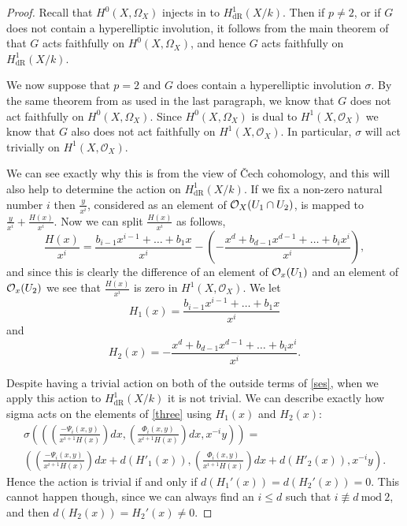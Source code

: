 \documentclass[draft, 11pt]{article} %
\theoremstyle{plain}
\theoremstyle{remark}
\newcommand{\cO}{{\cal O}}
\newcommand{\cech}{\v{C}ech }
\newcommand{\hzero}{{H^0(X,\Omega_X)}}
\newcommand{\hone}{H^1(X,\mathcal{O}_X)}
\newcommand{\derhamhone}{H_{\text {dR}}^1(X/k)}
\begin{document}
\begin{proof}
Recall that $H^0(X,\Omega_X)$ injects in to $\derhamhone$.
Then if $p \neq 2$, or if $G$ does not contain a hyperelliptic involution, it follows from the main theorem of \cite{faithfulaction} that $G$ acts faithfully on $H^0(X,\Omega_X)$, and hence $G$ acts faithfully on $\derhamhone$.

We now suppose that $p=2$ and $G$ does contain a hyperelliptic involution $\sigma$.
By the same theorem from \cite{faithfulaction} as used in the last paragraph, we know that $G$ does not act faithfully on $\hzero$.
Since $\hzero$ is dual to $\hone$ we know that $G$ also does not act faithfully on $\hone$.
In particular, $\sigma$ will act trivially on $\hone$.

We can see exactly why this is from the view of \cech cohomology, and this will also help to determine the action on $\derhamhone$.
If we fix a non-zero natural number $i$ then $\frac{y}{x^i}$, considered as an element of $\cO_X(U_1\cap U_2)$, is mapped to $\frac{y}{x^i} + \frac{H(x)}{x^i}$. 
Now we can split $\frac{H(x)}{x^i}$ as follows, 
\begin{equation*}
\frac{H(x)}{x^i} =  \frac{b_{i-1}x^{i-1} + \ldots + b_1x}{x^i} - \left( - \frac{x^d + b_{d-1}x^{d-1} + \ldots + b_ix^i}{x^i} \right),
\end{equation*}
and since this is clearly the difference of an element of $\cO_x(U_1)$ and an element of $\cO_x(U_2)$ we see that $\frac{H(x)}{x^i}$ is zero in $\hone$.
We let 
\[
H_1(x) = \frac{b_{i-1}x^{i-1} + \ldots + b_1x}{x^i}
\]
and 
\[
H_2(x) = - \frac{x^d + b_{d-1}x^{d-1} + \ldots + b_ix^i}{x^i}.
\]

Despite having a trivial action on both of the outside terms of \eqref{ses}, when we apply this action to $\derhamhone$ it is not trivial. 
We can describe exactly how sigma acts on the elements of \eqref{three} using $H_1(x)$ and $H_2(x)$:
\begin{multline}
\sigma \left( \left( \left(\frac{-\Psi_i(x,y)}{x^{i+1}H(x)}\right) dx, \left( \frac{\Phi_i(x,y)}{x^{i+1}H(x)} \right) dx, x^{-i}y \right)\right) = \\
 \left( \left(\frac{-\Psi_i(x,y)}{x^{i+1}H(x)} \right) dx + d\left(H'_1(x)\right),  \left( \frac{\Phi_i(x,y)}{x^{i+1}H(x)} \right) dx+ d\left(H'_2(x)\right) , x^{-i}y \right).
\end{multline}
Hence the action is trivial if and only if $d\left(H_1'(x)\right) = d\left(H_2'(x)\right) =0$.
This cannot happen though, since we can always find an $i\leq d$ such that $i \not\equiv d\ \text{mod}\ 2$, and then $d\left(H_2(x)\right) = H_2'(x) \neq 0$.
\end{proof}
\end{document}
